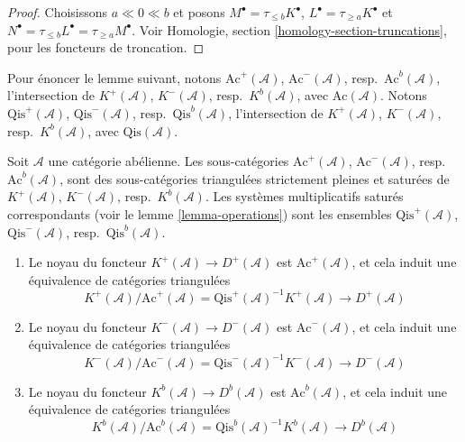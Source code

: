 \begin{proof}
Choisissons $a \ll 0 \ll b$ et posons
$M^\bullet = \tau_{\leq b}K^\bullet$,
$L^\bullet = \tau_{\geq a}K^\bullet$ et
$N^\bullet = \tau_{\leq b}L^\bullet = \tau_{\geq a}M^\bullet$.
Voir Homologie, section \ref{homology-section-truncations}, pour les foncteurs
de troncation.
\end{proof}

\noindent
Pour énoncer le lemme suivant, notons
$\text{Ac}^{+}(\mathcal{A})$, $\text{Ac}^{-}(\mathcal{A})$, resp.\
$\text{Ac}^b(\mathcal{A})$, l'intersection de
$K^{+}(\mathcal{A})$, $K^{-}(\mathcal{A})$, resp.\ $K^b(\mathcal{A})$, avec
$\text{Ac}(\mathcal{A})$. Notons
$\text{Qis}^{+}(\mathcal{A})$, $\text{Qis}^{-}(\mathcal{A})$, resp.\
$\text{Qis}^b(\mathcal{A})$, l'intersection de
$K^{+}(\mathcal{A})$, $K^{-}(\mathcal{A})$, resp.\ $K^b(\mathcal{A})$, avec
$\text{Qis}(\mathcal{A})$.

\begin{lemma}
\label{lemma-bounded-derived}
Soit $\mathcal{A}$ une catégorie abélienne. Les sous-catégories
$\text{Ac}^{+}(\mathcal{A})$, $\text{Ac}^{-}(\mathcal{A})$, resp.\
$\text{Ac}^b(\mathcal{A})$, sont des sous-catégories triangulées strictement
pleines et saturées de $K^{+}(\mathcal{A})$, $K^{-}(\mathcal{A})$, resp.\
$K^b(\mathcal{A})$. Les systèmes multiplicatifs saturés correspondants (voir
le lemme \ref{lemma-operations}) sont les ensembles
$\text{Qis}^{+}(\mathcal{A})$, $\text{Qis}^{-}(\mathcal{A})$, resp.\
$\text{Qis}^b(\mathcal{A})$.
\begin{enumerate}
\item Le noyau du foncteur $K^{+}(\mathcal{A}) \to D^{+}(\mathcal{A})$ est
$\text{Ac}^{+}(\mathcal{A})$, et cela induit une équivalence de catégories
triangulées
$$
K^{+}(\mathcal{A})/\text{Ac}^{+}(\mathcal{A}) =
\text{Qis}^{+}(\mathcal{A})^{-1}K^{+}(\mathcal{A})
\longrightarrow
D^{+}(\mathcal{A})
$$
\item Le noyau du foncteur $K^{-}(\mathcal{A}) \to D^{-}(\mathcal{A})$ est
$\text{Ac}^{-}(\mathcal{A})$, et cela induit une équivalence de catégories
triangulées
$$
K^{-}(\mathcal{A})/\text{Ac}^{-}(\mathcal{A}) =
\text{Qis}^{-}(\mathcal{A})^{-1}K^{-}(\mathcal{A})
\longrightarrow
D^{-}(\mathcal{A})
$$
\item Le noyau du foncteur $K^b(\mathcal{A}) \to D^b(\mathcal{A})$ est
$\text{Ac}^b(\mathcal{A})$, et cela induit une équivalence de catégories
triangulées
$$
K^b(\mathcal{A})/\text{Ac}^b(\mathcal{A}) =
\text{Qis}^b(\mathcal{A})^{-1}K^b(\mathcal{A})
\longrightarrow
D^b(\mathcal{A})
$$
\end{enumerate}
\end{lemma}

